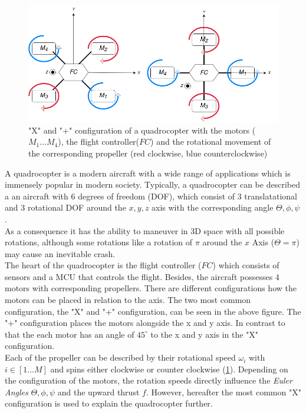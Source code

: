 \begin{figure}
	\centering
	\includegraphics[width= \linewidth]{figures/quad.png} 
	\caption{"X" and "+" configuration of a quadrocopter with the motors ($M_1 ... M_4$), the flight controller($FC$) and the rotational movement of the corresponding propeller (red clockwise, blue counterclockwise)}
	\label{fig:quad}
\end{figure}

A quadrocopter is a modern aircraft with a wide range of applications which is immensely popular in modern society.  Typically, a quadrocopter can be described a an aircraft with 6 degrees of freedom (DOF), which consist of 3 translatational  and 3 rotational DOF around the $x,y,z$ axis with the corresponding angle $\Theta, \phi, \psi$. \\
As a consequence it has the ability to maneuver in 3D space with all possible rotations, although some rotations like a rotation of $\pi$ around the $x$ Axis ($\Theta = \pi$) may cause an inevitable crash. \\
The heart of the quadrocopter is the flight controller ($FC$) which consists of sensors and a MCU that controls the flight. Besides, the aircraft possesses 4 motors with corresponding propellers. There are different configurations how the motors can be placed in relation to the axis. The two most common configuration, the "X" and "+" configuration, can be seen in the above figure. The "+" configuration places the motors alongside the x and y axis. In contrast to that the each motor has an angle of $45^{\circ}$ to the x and y axis in the "X" configuration.\\
Each of the propeller can be described by their rotational speed $\omega_i$ with $i \in [1...M]$ and spins either clockwise or counter clockwise (\cref{fig:quad}).  Depending on the configuration of the motors,
the rotation speeds directly influence the \emph{Euler Angles} $\Theta, \phi, \psi$ and
the upward thrust $f$. However, hereafter the most common "X" configuration is used to explain the quadrocopter further.

